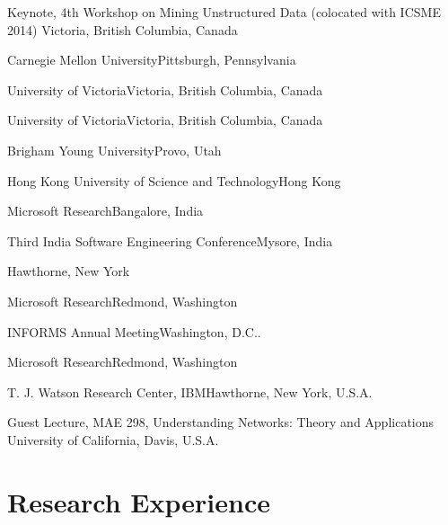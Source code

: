 \documentclass[11pt,letterpaper,roman]{moderncv} %
\begin{document}
	{Keynote, 4th Workshop on Mining Unstructured Data (colocated with ICSME 2014)}
	{Victoria, British Columbia, Canada}{}{}

{Carnegie Mellon University}{Pittsburgh, Pennsylvania}{}{}
	
{University of Victoria}{Victoria, British Columbia, Canada}{}{}

{University of Victoria}{Victoria, British Columbia, Canada}{}{}

{Brigham Young University}{Provo, Utah}{}{}

{Hong Kong University of Science and Technology}{Hong Kong}{}{}

{Microsoft Research}{Bangalore, India}{}{}

{Third India Software Engineering Conference}{Mysore, India}{}{}

{Hawthorne, New York}{}{}

{Microsoft Research}{Redmond, Washington}{}{}

{INFORMS Annual Meeting}{Washington, D.C..}{}{}

{Microsoft Research}{Redmond, Washington}{}{}

{T. J. Watson Research Center, IBM}{Hawthorne, New York, U.S.A.}{}{}

{Guest Lecture, MAE 298, Understanding Networks: Theory and Applications}
{University of California, Davis, U.S.A.}{}{}

\section{Research Experience}
\end{document}

